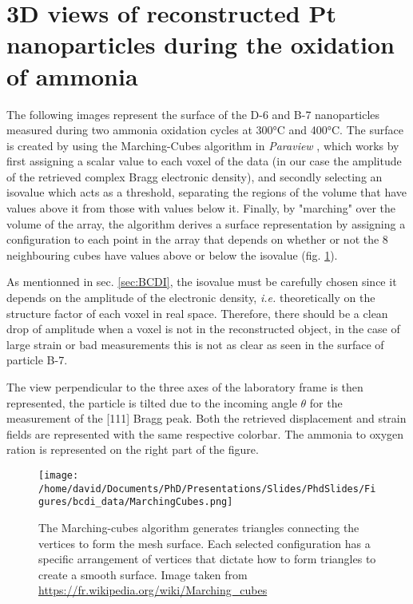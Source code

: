 \section{3D views of reconstructed Pt nanoparticles during the oxidation of ammonia}\label{sec:3DAmmoniaOxidation}

The following images represent the surface of the D-6 and B-7 nanoparticles measured during two ammonia oxidation cycles at 300°C and 400°C.
The surface is created by using the Marching-Cubes algorithm \parencite{Lorensen1987} in \textit{Paraview} \parencite{Ahrens2001}, which works by first assigning a scalar value to each voxel of the data (in our case the amplitude of the retrieved complex Bragg electronic density), and secondly selecting an isovalue which acts as a threshold, separating the regions of the volume that have values above it from those with values below it.
Finally, by "marching" over the volume of the array, the algorithm derives a surface representation by assigning a configuration to each point in the array that depends on whether or not the 8 neighbouring cubes have values above or below the isovalue (fig. \ref{fig:MarchingCubes}).

As mentionned in sec. \ref{sec:BCDI}, the isovalue must be carefully chosen since it depends on the amplitude of the electronic density, \textit{i.e.} theoretically on the structure factor of each voxel in real space.
Therefore, there should be a clean drop of amplitude when a voxel is not in the reconstructed object, in the case of large strain or bad measurements this is not as clear as seen in the surface of particle B-7.

The view perpendicular to the three axes of the laboratory frame is then represented, the particle is tilted due to the incoming angle $\theta$ for the measurement of the [111] Bragg peak.
Both the retrieved displacement and strain fields are represented with the same respective colorbar.
The ammonia to oxygen ration is represented on the right part of the figure.

\begin{figure}[!htb]
    \centering
    \texttt{[image: /home/david/Documents/PhD/Presentations/Slides/PhdSlides/Figures/bcdi\_data/MarchingCubes.png]}
    \caption{
    The Marching-cubes algorithm generates triangles connecting the vertices to form the mesh surface.
    Each selected configuration has a specific arrangement of vertices that dictate how to form triangles to create a smooth surface.
    Image taken from \url{https://fr.wikipedia.org/wiki/Marching_cubes}
    }
    \label{fig:MarchingCubes}
\end{figure}

\label{ref:AppendixB7}
\label{ref:AppendixD6}